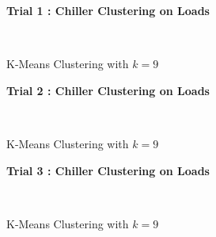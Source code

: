 \begin{figure}[!h]
\centerline{\bfseries\Large Trial 1 : Chiller Clustering on Loads}\\
\caption{K-Means Clustering with $k=9$}
\end{figure}
\begin{figure}[!h]
\centerline{\bfseries\Large Trial 2 : Chiller Clustering on Loads}\\
\caption{K-Means Clustering with $k=9$}
\end{figure}
\begin{figure}[!h]
\centerline{\bfseries\Large Trial 3 : Chiller Clustering on Loads}\\
\caption{K-Means Clustering with $k=9$}
\end{figure}
